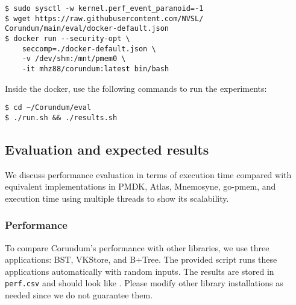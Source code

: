 {\begin{verbatim}
$ sudo sysctl -w kernel.perf_event_paranoid=-1
$ wget https://raw.githubusercontent.com/NVSL/
Corundum/main/eval/docker-default.json
$ docker run --security-opt \
    seccomp=./docker-default.json \
    -v /dev/shm:/mnt/pmem0 \
    -it mhz88/corundum:latest bin/bash
\end{verbatim}

\noindent
Inside the docker, use the following commands to run the experiments:

\begin{verbatim}
$ cd ~/Corundum/eval
$ ./run.sh && ./results.sh
\end{verbatim}

\subsection{Evaluation and expected results}

We discuss performance evaluation in terms of execution time compared with equivalent implementations in PMDK, Atlas, Mnemosyne, go-pmem, and execution time using multiple threads to show its scalability. 

\subsubsection{Performance}

To compare Corundum's performance with other libraries, we use three applications: BST, VKStore, and B+Tree. The provided script runs these applications automatically with random inputs. The results are stored in \verb+perf.csv+ and should look like . Please modify other library installations as needed since we do not guarantee them.

}
